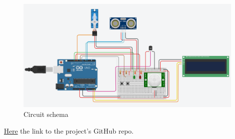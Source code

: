 \documentclass[a4paper,12pt]{report}
\begin{document}
    \begin{figure}[H]
        \centering{}
            \includegraphics[width=\textwidth]{img/Assignment-02_SWDS-Schema.png}
        \caption{Circuit schema}
        \label{img:schema}
    \end{figure}
    
    \href{https://github.com/Sansalina/IoT-assignment-02}{Here} the link to the project's GitHub repo.
\end{document}
